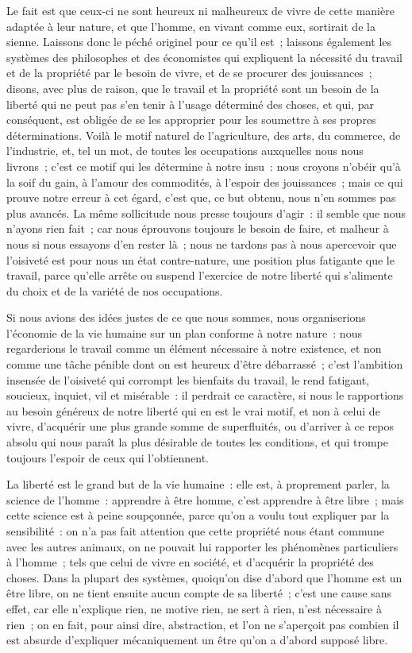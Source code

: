 \documentclass[french,twoside]{book} %
\newcommand\chapterclose{} %
\begin{document}
Le fait est que ceux-ci ne sont heureux ni malheureux de vivre de cette manière adaptée à leur nature, et que l’homme, en vivant comme eux, sortirait de la sienne. Laissons donc le péché originel pour ce qu’il est ; laissons également les systèmes des philosophes et des économistes qui expliquent la nécessité du travail et de la propriété par le besoin de vivre, et de se procurer des jouissances ; disons, avec plus de raison, que le travail et la propriété sont un besoin de la liberté qui ne peut pas s’en tenir à l’usage déterminé des choses, et qui, par conséquent, est obligée de se les approprier pour les soumettre à ses propres déterminations. Voilà le motif naturel de l’agriculture, des arts, du commerce, de l’industrie, et, tel un mot, de toutes les occupations auxquelles nous nous livrons ; c’est ce motif qui les détermine à notre insu : nous croyons n’obéir qu’à la soif du gain, à l’amour des commodités, à l’espoir des jouissances ; mais ce qui prouve notre erreur à cet égard, c’est que, ce but obtenu, nous n’en sommes pas plus avancés. La même sollicitude nous presse toujours d’agir : il semble que nous n’ayons rien fait ; car nous éprouvons toujours le besoin de faire, et malheur à nous si nous essayons d’en rester là ; nous ne tardons pas à nous apercevoir que l’oisiveté est pour nous un état contre-nature, une position plus fatigante que le travail, parce qu’elle arrête ou suspend l’exercice de notre liberté qui s’alimente du choix et de la variété de nos occupations.\par
Si nous avions des idées justes de ce que nous sommes, nous organiserions l’économie de la vie humaine sur un plan conforme à notre nature : nous regarderions le travail comme un élément nécessaire à notre existence, et non comme une tâche pénible dont on est heureux d’être débarrassé ; c’est l’ambition insensée de l’oisiveté qui corrompt les bienfaits du travail, le rend fatigant, soucieux, inquiet, vil et misérable : il perdrait ce caractère, si nous le rapportions au besoin généreux de notre liberté qui en est le vrai motif, et non à celui de vivre, d’acquérir une plus grande somme de superfluités, ou d’arriver à ce repos absolu qui nous paraît la plus désirable de toutes les conditions, et qui trompe toujours l’espoir de ceux qui l’obtiennent.\par
La liberté est le grand but de la vie humaine : elle est, à proprement parler, la science de l’homme : apprendre à être homme, c’est apprendre à être libre ; mais cette science est à peine soupçonnée, parce qu’on a voulu tout expliquer par la sensibilité : on n’a pas fait attention que cette propriété nous étant commune avec les autres animaux, on ne pouvait lui rapporter les phénomènes particuliers à l’homme ; tels que celui de vivre en société, et d’acquérir la propriété des choses. Dans la plupart des systèmes, quoiqu’on dise d’abord que l’homme est un être libre, on ne tient ensuite aucun compte de sa liberté ; c’est une cause sans effet, car elle n’explique rien, ne motive rien, ne sert à rien, n’est nécessaire à rien ; on en fait, pour ainsi dire, abstraction, et l’on ne s’aperçoit pas combien il est absurde d’expliquer mécaniquement un être qu’on a d’abord supposé libre.
\chapterclose
\end{document}
